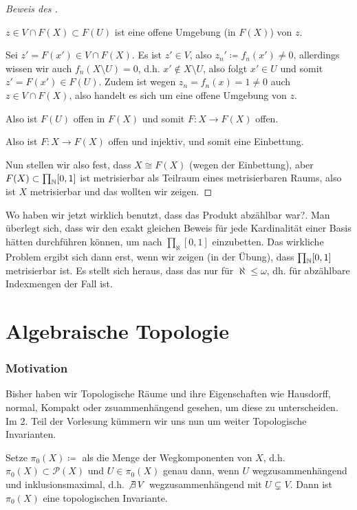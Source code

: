 \begin{proof}[Beweis des ]
\begin{subproof}
\begin{itemize}
\begin{claim}
                    $z\in V\cap F(X) \subset F(U)$ ist eine offene Umgebung (in $F(X)$) von  $z$.
                \end{claim}
                \begin{subproof}
                    Sei $z' = F(x')\in V\cap F(X)$. Es ist $z'\in V$, also $z_n' \coloneqq  f_n(x') \neq 0$, allerdings wissen wir auch $f_n(X\setminus U) = 0$, d.h. $x' \not\in X\setminus U$, also folgt $x'\in U$ und somit $z' = F(x') \in F(U)$. Zudem ist wegen $z_n = f_n(x)=1 \neq 0$ auch $z \in V \cap F(X)$, also handelt es sich um eine offene Umgebung von $z$.
                \end{subproof}
                Also ist $F(U)$ offen in  $F(X)$ und somit  $F\colon X \to  F(X)$ offen.
        \end{itemize}
        Also ist $F\colon X \to  F(X)$ offen und injektiv, und somit eine Einbettung.
    \end{subproof}
    Nun stellen wir also fest, dass $X \cong F(X)$ (wegen der Einbettung), aber  $F(X) \subset  \prod_{\mathbb{N}}[0,1]$ ist metrisierbar als Teilraum eines metrisierbaren Raums, also ist $X$ metrisierbar und das wollten wir zeigen.
\end{proof}

\begin{oral}
    Wo haben wir jetzt wirklich benutzt, dass das Produkt abzählbar war?. Man überlegt sich, dass wir den exakt gleichen Beweis für jede Kardinalität einer Basis hätten durchführen können, um nach $\prod_{\aleph} [0,1]$ einzubetten. Das wirkliche Problem ergibt sich dann erst, wenn wir zeigen (in der Übung), dass $\prod_{\mathbb{N}}[0,1]$ metrisierbar ist. Es stellt sich heraus, dass das nur für $\aleph\leq \omega $, dh. für abzählbare Indexmengen der Fall ist.
\end{oral}

\newpage
\part{Algebraische Topologie}

\section*{Motivation}

Bisher haben wir Topologische Räume und ihre Eigenschaften wie Hausdorff, normal, Kompakt oder zsuammenhängend gesehen, um diese zu unterscheiden. Im 2. Teil der Vorlesung kümmern wir uns nun um weiter Topologische Invarianten.
\begin{example}
    Setze $\pi_0(X) \coloneqq $ als die Menge der Wegkomponenten von  $X$, d.h.  $\pi_0(X) \subset \mathcal{P}(X)$ und $U\in \pi_0(X)$ genau dann, wenn $U$ wegzusammenhängend und inklusionsmaximal, d.h. $\not \exists \,V$ wegzusammenhängend mit $U\subsetneq  V$. Dann ist $\pi_0(X)$ eine topologischen Invariante.
\end{example}

